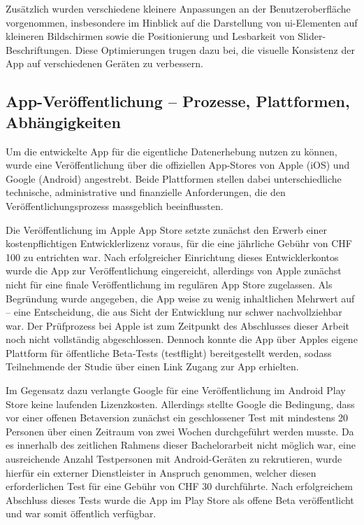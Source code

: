 Zusätzlich wurden verschiedene kleinere Anpassungen an der Benutzeroberfläche vorgenommen, insbesondere im Hinblick auf die Darstellung von \gls{ui}-Elementen auf kleineren Bildschirmen sowie die Positionierung und Lesbarkeit von Slider-Beschriftungen. Diese Optimierungen trugen dazu bei, die visuelle Konsistenz der App auf verschiedenen Geräten zu verbessern.

\subsection{App-Veröffentlichung – Prozesse, Plattformen, Abhängigkeiten}

Um die entwickelte App für die eigentliche Datenerhebung nutzen zu können, wurde eine Veröffentlichung über die offiziellen App-Stores von Apple (iOS) und Google (Android) angestrebt. Beide Plattformen stellen dabei unterschiedliche technische, administrative und finanzielle Anforderungen, die den Veröffentlichungsprozess massgeblich beeinflussten.

Die Veröffentlichung im Apple App Store setzte zunächst den Erwerb einer kostenpflichtigen Entwicklerlizenz voraus, für die eine jährliche Gebühr von CHF 100 zu entrichten war. Nach erfolgreicher Einrichtung dieses Entwicklerkontos wurde die App zur Veröffentlichung eingereicht, allerdings von Apple zunächst nicht für eine finale Veröffentlichung im regulären App Store zugelassen. Als Begründung wurde angegeben, die App weise zu wenig inhaltlichen Mehrwert auf – eine Entscheidung, die aus Sicht der Entwicklung nur schwer nachvollziehbar war. Der Prüfprozess bei Apple ist zum Zeitpunkt des Abschlusses dieser Arbeit noch nicht vollständig abgeschlossen. Dennoch konnte die App über Apples eigene Plattform für öffentliche Beta-Tests (\gls{testflight}) bereitgestellt werden, sodass Teilnehmende der Studie über einen Link Zugang zur App erhielten.

Im Gegensatz dazu verlangte Google für eine Veröffentlichung im Android Play Store keine laufenden Lizenzkosten. Allerdings stellte Google die Bedingung, dass vor einer offenen Betaversion zunächst ein geschlossener Test mit mindestens 20 Personen über einen Zeitraum von zwei Wochen durchgeführt werden musste. Da es innerhalb des zeitlichen Rahmens dieser Bachelorarbeit nicht möglich war, eine ausreichende Anzahl Testpersonen mit Android-Geräten zu rekrutieren, wurde hierfür ein externer Dienstleister in Anspruch genommen, welcher diesen erforderlichen Test für eine Gebühr von CHF 30 durchführte. Nach erfolgreichem Abschluss dieses Tests wurde die App im Play Store als offene Beta veröffentlicht und war somit öffentlich verfügbar.

